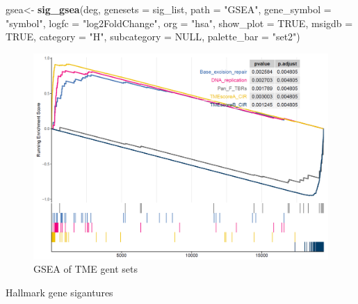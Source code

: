 \documentclass[
  12pt,
]{book}
\newenvironment{Shaded}{\begin{snugshade}}{\end{snugshade}}
\newcommand{\AttributeTok}[1]{\textcolor[rgb]{0.13,0.29,0.53}{#1}}
\newcommand{\ConstantTok}[1]{\textcolor[rgb]{0.56,0.35,0.01}{#1}}
\newcommand{\FunctionTok}[1]{\textcolor[rgb]{0.13,0.29,0.53}{\textbf{#1}}}
\newcommand{\NormalTok}[1]{#1}
\newcommand{\OtherTok}[1]{\textcolor[rgb]{0.56,0.35,0.01}{#1}}
\newcommand{\StringTok}[1]{\textcolor[rgb]{0.31,0.60,0.02}{#1}}
\begin{document}
\begin{Shaded}
\begin{Highlighting}[]
\NormalTok{gsea}\OtherTok{\textless{}{-}}     \FunctionTok{sig\_gsea}\NormalTok{(deg,}
                    \AttributeTok{genesets          =}\NormalTok{ sig\_list,}
                    \AttributeTok{path              =} \StringTok{"GSEA"}\NormalTok{,}
                    \AttributeTok{gene\_symbol       =} \StringTok{"symbol"}\NormalTok{,}
                    \AttributeTok{logfc             =} \StringTok{"log2FoldChange"}\NormalTok{,}
                    \AttributeTok{org               =} \StringTok{"hsa"}\NormalTok{,}
                    \AttributeTok{show\_plot         =} \ConstantTok{TRUE}\NormalTok{,}
                    \AttributeTok{msigdb            =} \ConstantTok{TRUE}\NormalTok{,}
                    \AttributeTok{category          =} \StringTok{"H"}\NormalTok{,}
                    \AttributeTok{subcategory       =} \ConstantTok{NULL}\NormalTok{,}
                    \AttributeTok{palette\_bar       =} \StringTok{"set2"}\NormalTok{)}
\end{Highlighting}
\end{Shaded}

\begin{figure}

{\centering \includegraphics[width=0.95\linewidth]{./fig/gsea-1} 

}

\caption{GSEA of TME gent sets}\label{fig:unnamed-chunk-9}
\end{figure}

Hallmark gene sigantures
\end{document}
